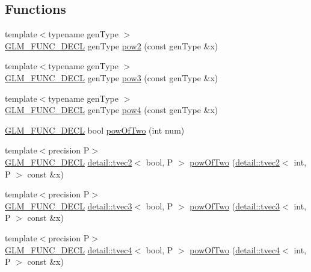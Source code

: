 \subsection*{Functions}
\begin{DoxyCompactItemize}
\item 
{\footnotesize template$<$typename gen\+Type $>$ }\\\hyperlink{setup_8hpp_ab2d052de21a70539923e9bcbf6e83a51}{G\+L\+M\+\_\+\+F\+U\+N\+C\+\_\+\+D\+E\+CL} gen\+Type \hyperlink{group__gtx__optimum__pow_gad18baedb0f3eaea4b4544771e19574f5}{pow2} (const gen\+Type \&x)
\item 
{\footnotesize template$<$typename gen\+Type $>$ }\\\hyperlink{setup_8hpp_ab2d052de21a70539923e9bcbf6e83a51}{G\+L\+M\+\_\+\+F\+U\+N\+C\+\_\+\+D\+E\+CL} gen\+Type \hyperlink{group__gtx__optimum__pow_ga47dbbd973d7ad8be1b135d57281e16cf}{pow3} (const gen\+Type \&x)
\item 
{\footnotesize template$<$typename gen\+Type $>$ }\\\hyperlink{setup_8hpp_ab2d052de21a70539923e9bcbf6e83a51}{G\+L\+M\+\_\+\+F\+U\+N\+C\+\_\+\+D\+E\+CL} gen\+Type \hyperlink{group__gtx__optimum__pow_gabae007bac8e442a2601db03de5827107}{pow4} (const gen\+Type \&x)
\item 
\hyperlink{setup_8hpp_ab2d052de21a70539923e9bcbf6e83a51}{G\+L\+M\+\_\+\+F\+U\+N\+C\+\_\+\+D\+E\+CL} bool \hyperlink{group__gtx__optimum__pow_ga399b24df28267c1f061c462dd359affd}{pow\+Of\+Two} (int num)
\item 
{\footnotesize template$<$precision P$>$ }\\\hyperlink{setup_8hpp_ab2d052de21a70539923e9bcbf6e83a51}{G\+L\+M\+\_\+\+F\+U\+N\+C\+\_\+\+D\+E\+CL} \hyperlink{structglm_1_1detail_1_1tvec2}{detail\+::tvec2}$<$ bool, P $>$ \hyperlink{group__gtx__optimum__pow_ga2dff80972edb8f4be69e40bb27ed0a9b}{pow\+Of\+Two} (\hyperlink{structglm_1_1detail_1_1tvec2}{detail\+::tvec2}$<$ int, P $>$ const \&x)
\item 
{\footnotesize template$<$precision P$>$ }\\\hyperlink{setup_8hpp_ab2d052de21a70539923e9bcbf6e83a51}{G\+L\+M\+\_\+\+F\+U\+N\+C\+\_\+\+D\+E\+CL} \hyperlink{structglm_1_1detail_1_1tvec3}{detail\+::tvec3}$<$ bool, P $>$ \hyperlink{group__gtx__optimum__pow_ga103cbf6e3d63ab4c2bb5449e19b8639d}{pow\+Of\+Two} (\hyperlink{structglm_1_1detail_1_1tvec3}{detail\+::tvec3}$<$ int, P $>$ const \&x)
\item 
{\footnotesize template$<$precision P$>$ }\\\hyperlink{setup_8hpp_ab2d052de21a70539923e9bcbf6e83a51}{G\+L\+M\+\_\+\+F\+U\+N\+C\+\_\+\+D\+E\+CL} \hyperlink{structglm_1_1detail_1_1tvec4}{detail\+::tvec4}$<$ bool, P $>$ \hyperlink{group__gtx__optimum__pow_ga3471bc7e9e580f6b76647cb5156135cc}{pow\+Of\+Two} (\hyperlink{structglm_1_1detail_1_1tvec4}{detail\+::tvec4}$<$ int, P $>$ const \&x)
\end{DoxyCompactItemize}
